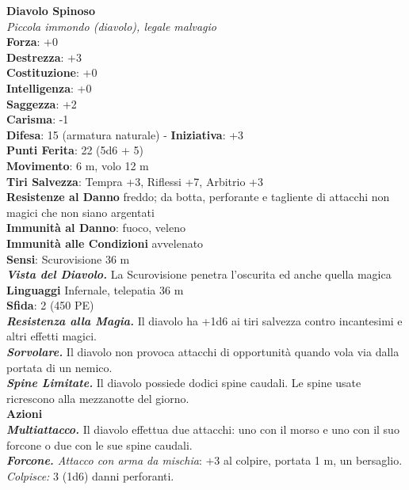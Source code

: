 \begin{multicols}{2}
\medskip\textbf{Diavolo Spinoso}\\
\emph{Piccola immondo (diavolo), legale malvagio}\\
\textbf{Forza}: +0\\
\textbf{Destrezza}: +3\\
\textbf{Costituzione}: +0\\
\textbf{Intelligenza}: +0\\
\textbf{Saggezza}: +2\\
\textbf{Carisma}: -1\\
\textbf{Difesa}: 15 (armatura naturale) - \textbf{Iniziativa}: +3\\
\textbf{Punti Ferita}: 22 (5d6 + 5)\\
\textbf{Movimento}: 6 m, volo 12 m\\
\textbf{Tiri Salvezza}: Tempra +3, Riflessi +7, Arbitrio +3\\
\textbf{Resistenze al Danno} freddo; da botta, perforante e tagliente di attacchi non magici che non siano argentati\\
\textbf{Immunità al Danno}: fuoco, veleno \\
\textbf{Immunità alle Condizioni} avvelenato\\
\textbf{Sensi}: Scurovisione 36 m\\
\emph{\textbf{Vista del Diavolo.}} La Scurovisione penetra l'oscurita ed anche quella magica\\
\textbf{Linguaggi} Infernale, telepatia 36 m \\
\textbf{Sfida}: 2 (450 PE)\smallskip\\
\emph{\textbf{Resistenza alla Magia.}} Il diavolo ha +1d6 ai tiri salvezza contro incantesimi e altri effetti magici.\\
\emph{\textbf{Sorvolare.}} Il diavolo non provoca attacchi di opportunità quando vola via dalla portata di un nemico.\\
\emph{\textbf{Spine Limitate.}} Il diavolo possiede dodici spine caudali. Le spine usate ricrescono alla mezzanotte del giorno.\\
\smallskip\textbf{Azioni}\\
\emph{\textbf{Multiattacco.}} Il diavolo effettua due attacchi: uno con il morso e uno con il suo forcone o due con le sue spine caudali.\\
\emph{\textbf{Forcone.} Attacco con arma da mischia}: +3 al colpire, portata 1 m, un bersaglio.\\
\emph{Colpisce:} 3 (1d6) danni perforanti. \\

\end{multicols}
